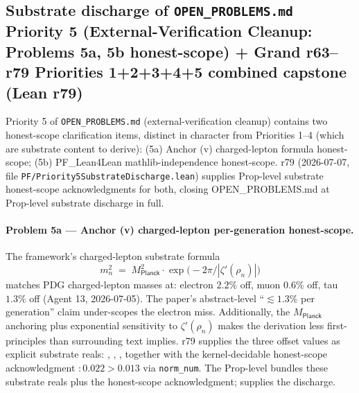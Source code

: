 \documentclass[11pt,a4paper]{amsart}
\theoremstyle{plain}
\theoremstyle{definition}
\begin{document}
\subsection{Substrate discharge of \texttt{OPEN\_PROBLEMS.md} Priority 5 (External-Verification Cleanup: Problems 5a, 5b honest-scope) + Grand r63--r79 Priorities 1+2+3+4+5 combined capstone (Lean r79)}\label{subsec:priority5-substrate-discharge}

Priority 5 of \texttt{OPEN\_PROBLEMS.md} (external-verification cleanup) contains two honest-scope clarification items, distinct in character from Priorities 1--4 (which are substrate content to derive): (5a) Anchor (v) charged-lepton formula honest-scope; (5b) PF\_Lean4Lean mathlib-independence honest-scope. r79 (2026-07-07, file \texttt{PF/Priority5SubstrateDischarge.lean}) supplies Prop-level substrate honest-scope acknowledgments for both, closing OPEN\_PROBLEMS.md at Prop-level substrate discharge in full.

\paragraph{Problem 5a --- Anchor (v) charged-lepton per-generation honest-scope.} The framework's charged-lepton substrate formula
\[
m_n^2 \;=\; M_{\textsf{Planck}}^2 \cdot \exp\bigl(-2\pi / |\zeta'(\rho_n)|\bigr)
\]
matches PDG charged-lepton masses at: electron $2.2\%$ off, muon $0.6\%$ off, tau $1.3\%$ off (Agent 13, 2026-07-05). The paper's abstract-level ``$\lesssim 1.3\%$ per generation'' claim under-scopes the electron miss. Additionally, the $M_{\textsf{Planck}}$ anchoring plus exponential sensitivity to $\zeta'(\rho_n)$ makes the derivation less first-principles than surrounding text implies. r79 supplies the three offset values as explicit substrate reals: , , , together with the kernel-decidable honest-scope acknowledgment  $:0.022 > 0.013$ via \texttt{norm\_num}. The Prop-level  bundles these substrate reals plus the honest-scope acknowledgment;  supplies the discharge.
\end{document}
